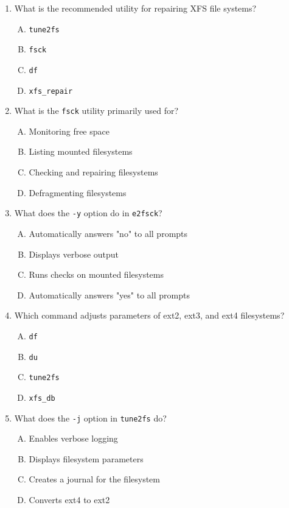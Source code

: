 \documentclass[a4paper]{report}
\begin{document}
\begin{enumerate}[1.]
    \item What is the recommended utility for repairing XFS file systems?  
    \begin{enumerate}[A)]
        \item \texttt{tune2fs}  
        \item \texttt{fsck}  
        \item \texttt{df}  
        \item \texttt{xfs\_repair}  
    \end{enumerate}

    \item What is the \texttt{fsck} utility primarily used for?  
    \begin{enumerate}[A)]
        \item Monitoring free space  
        \item Listing mounted filesystems  
        \item Checking and repairing filesystems  
        \item Defragmenting filesystems  
    \end{enumerate}

    \item What does the \texttt{-y} option do in \texttt{e2fsck}?  
    \begin{enumerate}[A)]
        \item Automatically answers "no" to all prompts  
        \item Displays verbose output  
        \item Runs checks on mounted filesystems  
        \item Automatically answers "yes" to all prompts  
    \end{enumerate}

    \item Which command adjusts parameters of ext2, ext3, and ext4 filesystems?  
    \begin{enumerate}[A)]
        \item \texttt{df}  
        \item \texttt{du}  
        \item \texttt{tune2fs}  
        \item \texttt{xfs\_db}  
    \end{enumerate}

    \item What does the \texttt{-j} option in \texttt{tune2fs} do?  
    \begin{enumerate}[A)]
        \item Enables verbose logging  
        \item Displays filesystem parameters  
        \item Creates a journal for the filesystem  
        \item Converts ext4 to ext2  
    \end{enumerate}


\end{enumerate}
\end{document}
